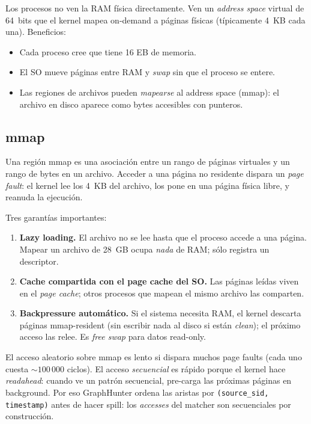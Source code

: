 Los procesos no ven la RAM física directamente. Ven un \emph{address
space} virtual de 64~bits que el kernel mapea on-demand a páginas
físicas (típicamente 4~KB cada una). Beneficios:

\begin{itemize}
    \item Cada proceso cree que tiene 16 EB de memoria.
    \item El SO mueve páginas entre RAM y \emph{swap} sin que el
    proceso se entere.
    \item Las regiones de archivos pueden \emph{mapearse} al address
    space (mmap): el archivo en disco aparece como bytes accesibles
    con punteros.
\end{itemize}

\subsection{mmap}

\begin{definition}
Una región mmap es una asociación entre un rango de páginas
virtuales y un rango de bytes en un archivo. Acceder a una página no
residente dispara un \emph{page fault}: el kernel lee los 4~KB del
archivo, los pone en una página física libre, y reanuda la
ejecución.
\end{definition}

Tres garantías importantes:

\begin{enumerate}
    \item \textbf{Lazy loading.} El archivo no se lee hasta que el
    proceso accede a una página. Mapear un archivo de 28~GB ocupa
    \emph{nada} de RAM; sólo registra un descriptor.
    \item \textbf{Cache compartida con el page cache del SO.} Las
    páginas leídas viven en el \emph{page cache}; otros procesos que
    mapean el mismo archivo las comparten.
    \item \textbf{Backpressure automático.} Si el sistema necesita
    RAM, el kernel descarta páginas mmap-resident
    (sin escribir nada al disco si están \emph{clean}); el próximo
    acceso las relee. Es \emph{free swap} para datos read-only.
\end{enumerate}

\begin{advertencia}
El acceso aleatorio sobre mmap es lento si dispara muchos page
faults (cada uno cuesta \(\sim 100\,000\) ciclos). El acceso
\emph{secuencial} es rápido porque el kernel hace
\emph{readahead}: cuando ve un patrón secuencial, pre-carga las
próximas páginas en background. Por eso GraphHunter ordena las
aristas por \texttt{(source\_sid, timestamp)} antes de hacer spill:
los \emph{accesses} del matcher son secuenciales por construcción.
\end{advertencia}

